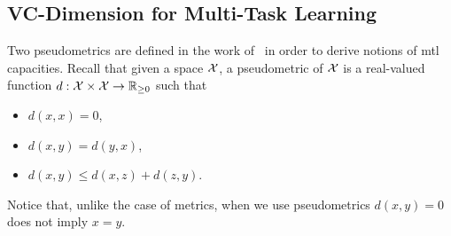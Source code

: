 \subsection{VC-Dimension for Multi-Task Learning}

Two pseudometrics are defined in the work of~\citet{baxter2000model} in order to derive notions of \acrshort{mtl} capacities.
Recall that given a space $\mathcal{X}$, a pseudometric of $\mathcal{X}$ is a real-valued function $d: \mathcal{X} \times \mathcal{X} \to \mathbb{R}_{\geq 0}$ such that 
\begin{itemize}
    \item $d(x, x) = 0$,
    \item $d(x, y) = d(y, x)$,
    \item $d(x, y) \leq d(x, z) + d(z, y)$.
\end{itemize}
Notice that, unlike the case of metrics, when we use pseudometrics $d(x, y)  = 0$ does not imply $x=y$.

